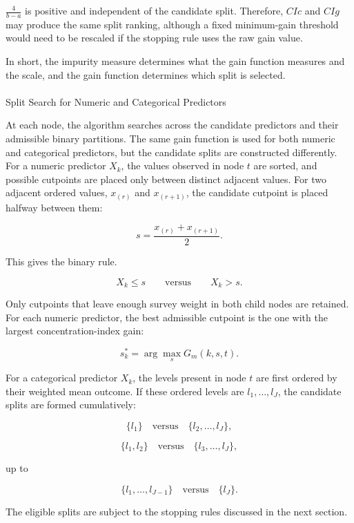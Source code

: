 \documentclass[
  11pt,
  a4paper,
]{article}
\makeatletter
\let\oldparagraph\paragraph
\renewcommand{\paragraph}{
    \@ifstar
      \xxxParagraphStar
      \xxxParagraphNoStar
  }
\newcommand{\xxxParagraphStar}[1]{\oldparagraph*{#1}\mbox{}}
\newcommand{\xxxParagraphNoStar}[1]{\oldparagraph{#1}\mbox{}}
\makeatother
\begin{document}
\(\frac{4}{b-a}\) is positive and independent of the candidate split.
Therefore, \(CIc\) and \(CIg\) may produce the same split ranking,
although a fixed minimum-gain threshold would need to be rescaled if the
stopping rule uses the raw gain value.

In short, the impurity measure determines what the gain function
measures and the scale, and the gain function determines which split is
selected.

\paragraph{Split Search for Numeric and Categorical
Predictors}\label{sec-split-search}

At each node, the algorithm searches across the candidate predictors and
their admissible binary partitions. The same gain function is used for
both numeric and categorical predictors, but the candidate splits are
constructed differently. For a numeric predictor \(X_k\), the values
observed in node \(t\) are sorted, and possible cutpoints are placed
only between distinct adjacent values. For two adjacent ordered values,
\(x_{(r)}\) and \(x_{(r+1)}\), the candidate cutpoint is placed halfway
between them:

\[
s = \frac{x_{(r)} + x_{(r+1)}}{2}.
\]

This gives the binary rule.

\[
X_k \leq s
\qquad \text{versus} \qquad
X_k > s.
\]

Only cutpoints that leave enough survey weight in both child nodes are
retained. For each numeric predictor, the best admissible cutpoint is
the one with the largest concentration-index gain:

\[
s_k^* = \arg\max_s G_m(k,s,t).
\]

For a categorical predictor \(X_k\), the levels present in node \(t\)
are first ordered by their weighted mean outcome. If these ordered
levels are \(l_1,\dots,l_J\), the candidate splits are formed
cumulatively:

\[
\{l_1\} \quad \text{versus} \quad \{l_2,\dots,l_J\},
\]

\[
\{l_1,l_2\} \quad \text{versus} \quad \{l_3,\dots,l_J\},
\]

up to

\[
\{l_1,\dots,l_{J-1}\} \quad \text{versus} \quad \{l_J\}.
\]

The eligible splits are subject to the stopping rules discussed in the
next section.
\end{document}
